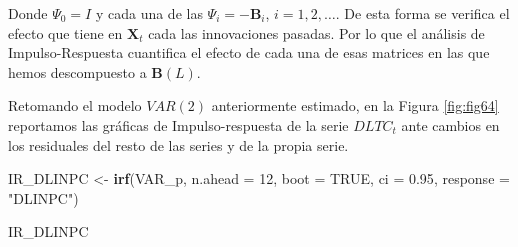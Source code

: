 \documentclass[
]{book}
\newenvironment{Shaded}{\begin{snugshade}}{\end{snugshade}}
\newcommand{\AttributeTok}[1]{\textcolor[rgb]{0.13,0.29,0.53}{#1}}
\newcommand{\ConstantTok}[1]{\textcolor[rgb]{0.56,0.35,0.01}{#1}}
\newcommand{\DecValTok}[1]{\textcolor[rgb]{0.00,0.00,0.81}{#1}}
\newcommand{\FloatTok}[1]{\textcolor[rgb]{0.00,0.00,0.81}{#1}}
\newcommand{\FunctionTok}[1]{\textcolor[rgb]{0.13,0.29,0.53}{\textbf{#1}}}
\newcommand{\NormalTok}[1]{#1}
\newcommand{\OtherTok}[1]{\textcolor[rgb]{0.56,0.35,0.01}{#1}}
\newcommand{\StringTok}[1]{\textcolor[rgb]{0.31,0.60,0.02}{#1}}
\begin{document}
Donde \(\Psi_0 = I\) y cada una de las \(\Psi_i = - \mathbf{B}_i\), \(i = 1, 2, \ldots\). De esta forma se verifica el efecto que tiene en \(\mathbf{X}_t\) cada las innovaciones pasadas. Por lo que el análisis de Impulso-Respuesta cuantifica el efecto de cada una de esas matrices en las que hemos descompuesto a \(\mathbf{B}(L)\).

Retomando el modelo \(VAR(2)\) anteriormente estimado, en la Figura \ref{fig:fig64} reportamos las gráficas de Impulso-respuesta de la serie \(DLTC_t\) ante cambios en los residuales del resto de las series y de la propia serie.

\begin{Shaded}
\begin{Highlighting}[]
\NormalTok{IR\_DLINPC }\OtherTok{\textless{}{-}} \FunctionTok{irf}\NormalTok{(VAR\_p, }\AttributeTok{n.ahead =} \DecValTok{12}\NormalTok{, }\AttributeTok{boot =} \ConstantTok{TRUE}\NormalTok{, }
                 \AttributeTok{ci =} \FloatTok{0.95}\NormalTok{, }\AttributeTok{response =} \StringTok{"DLINPC"}\NormalTok{)}

\NormalTok{IR\_DLINPC}
\end{Highlighting}
\end{Shaded}
\end{document}
